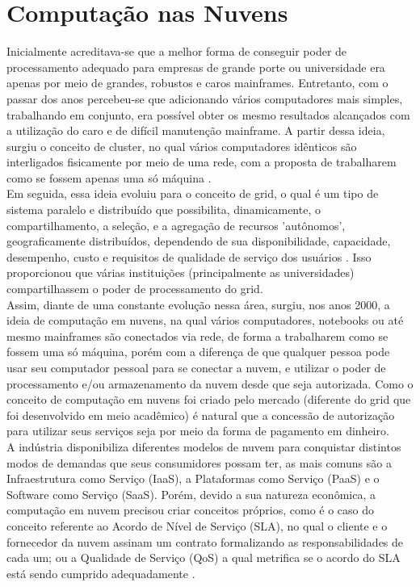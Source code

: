 	\section{Computação nas Nuvens}
Inicialmente acreditava-se que a melhor forma de conseguir poder de processamento adequado para empresas de grande porte ou universidade era apenas por meio de grandes, robustos e caros mainframes. Entretanto, com o passar dos anos percebeu-se que adicionando vários computadores mais simples, trabalhando em conjunto, era possível obter os mesmo resultados alcançados com a utilização do caro e de difícil manutenção mainframe.
A partir dessa ideia, surgiu o conceito de cluster, no qual vários computadores idênticos são interligados fisicamente por meio de uma rede, com a proposta de trabalharem como se fossem apenas uma só máquina \cite{buyya1}. \\

Em seguida, essa ideia evoluiu para o conceito de grid, o qual é um tipo de sistema paralelo e distribuído que possibilita, dinamicamente, o compartilhamento, a seleção, e a agregação de recursos 'autônomos', geograficamente distribuídos, dependendo de sua disponibilidade, capacidade, desempenho, custo e requisitos de qualidade de serviço dos usuários \cite{buyya1}. Isso proporcionou que várias instituições (principalmente as universidades) compartilhassem o poder de processamento do grid. \\

Assim, diante de uma constante evolução nessa área, surgiu, nos anos 2000, a ideia de computação em nuvens, na qual vários computadores, notebooks ou até mesmo mainframes são conectados via rede, de forma a trabalharem como se fossem uma só máquina, porém com a diferença de que qualquer pessoa pode usar seu computador pessoal para se conectar a nuvem, e utilizar o poder de processamento e/ou armazenamento da nuvem desde que seja autorizada. Como o conceito de computação em nuvens foi criado pelo mercado (diferente do grid que foi desenvolvido em meio acadêmico) é natural que a concessão de autorização para utilizar seus serviços seja por meio da forma de pagamento em dinheiro. \\

A indústria disponibiliza diferentes modelos de nuvem para conquistar distintos modos de demandas que seus consumidores possam ter, as mais comuns são a Infraestrutura como Serviço (IaaS), a Plataformas como Serviço (PaaS) e o Software como Serviço (SaaS). Porém, devido a sua natureza econômica, a computação em nuvem precisou criar conceitos próprios, como é o caso do conceito referente ao Acordo de Nível de Serviço (SLA), no qual o cliente e o fornecedor da nuvem assinam um contrato formalizando as responsabilidades de cada um; ou a Qualidade de Serviço (QoS) a qual metrifica se o acordo do SLA está sendo cumprido adequadamente \cite{buyya2}. \\

